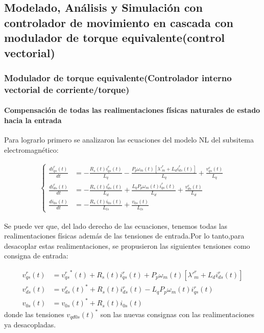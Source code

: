 \documentclass[a4paper, 10pt, onecolumn,journal]{ieeeconf}
\begin{document}
\subsection{\textbf{Modelado, Análisis y Simulación con controlador de movimiento en cascada con modulador de torque equivalente(control vectorial)}}


\subsubsection{\textbf{Modulador de torque equivalente(Controlador interno vectorial de corriente/torque)}}
\paragraph{\textbf{Compensación de todas las realimentaciones físicas naturales de estado hacia la entrada}}
Para lograrlo primero se analizaron las ecuaciones del modelo NL del subsitema electromagnético:

\begin{align}
	\begin{cases}
		\frac{d i^r_{qs}(t)}{dt} &= -\frac{R_s(t) i^r_{qs}(t)}{L_q} - \frac{P_p \omega_m(t) \left[\lambda'^r_m + L_d i^r_{ds}(t)\right]}{L_q} + \frac{v^r_{qs}(t)}{L_q}\\
		\frac{d i^r_{ds}(t)}{dt} &= -\frac{R_s(t) i^r_{ds}(t)}{L_d} + \frac{L_q P_p \omega_m(t)i^r_{qs}(t)}{L_d}  + \frac{v^r_{ds}(t)}{L_d} \\ 
		\frac{d i_{0s}(t)}{dt}   &= -\frac{R_s(t) i_{0s}(t)}{L_{ls}} + \frac{v_{0s}(t)}{L_{ls}}
	\end{cases}	\label{Ecuaciones NL del subsistema electromagnetico}
\end{align}

 Se puede ver que, del lado derecho de las ecuaciones, tenemos todas las realimentaciones físicas además de las tensiones de entrada.Por lo tanto,para desacoplar estas realimentaciones, se propusieron las siguientes tensiones como consigna de entrada:
 
 \begin{align}
 	v^r_{qs}(t) &= {v^r_{qs}}^*(t) + R_s(t) i^r_{qs}(t) + P_p \omega_m(t) \left[\lambda'^r_m + L_d i^r_{ds}(t)\right] \label{Ecuacion desacoplamientos en vqs}\\
 	v^r_{ds}(t) &= {v^r_{ds}(t)}^* + R_s(t) i^r_{ds}(t) - L_q P_p \omega_m(t)i^r_{qs}(t) \label{Ecuacion desacoplamientos en vds}\\ 
 	v_{0s}(t)   &= {v_{0s}(t)}^* + R_s(t) i_{0s}(t) \label{Ecuacion desacoplamientos en v0s}
 \end{align}
donde las tensiones  ${v_{qd0s}(t)}^*$ son las nuevas consignas con las realimentaciones ya desacopladas.
\end{document}
